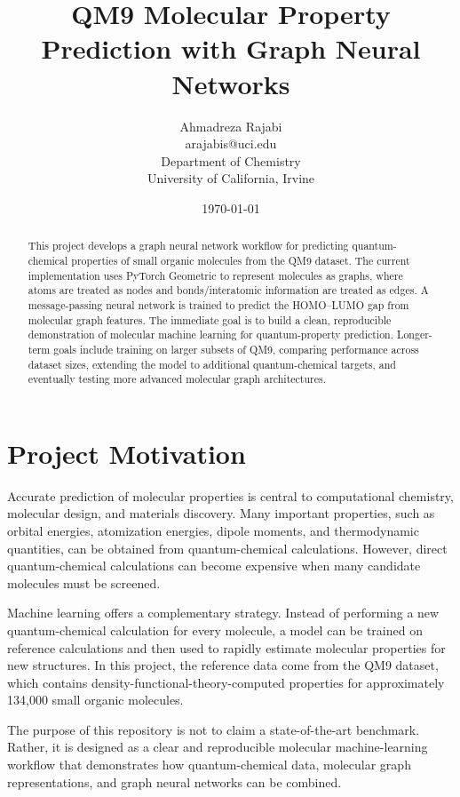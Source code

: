 \documentclass[11pt]{article}
\title{\textbf{QM9 Molecular Property Prediction with Graph Neural Networks}}
\author{
Ahmadreza Rajabi \\
arajabis@uci.edu \\
Department of Chemistry\\
University of California, Irvine
}
\date{\today}
\begin{document}
\maketitle

\begin{abstract}
This project develops a graph neural network workflow for predicting quantum-chemical properties of small organic molecules from the QM9 dataset. The current implementation uses PyTorch Geometric to represent molecules as graphs, where atoms are treated as nodes and bonds/interatomic information are treated as edges. A message-passing neural network is trained to predict the HOMO--LUMO gap from molecular graph features. The immediate goal is to build a clean, reproducible demonstration of molecular machine learning for quantum-property prediction. Longer-term goals include training on larger subsets of QM9, comparing performance across dataset sizes, extending the model to additional quantum-chemical targets, and eventually testing more advanced molecular graph architectures.
\end{abstract}

\section{Project Motivation}

Accurate prediction of molecular properties is central to computational chemistry, molecular design, and materials discovery. Many important properties, such as orbital energies, atomization energies, dipole moments, and thermodynamic quantities, can be obtained from quantum-chemical calculations. However, direct quantum-chemical calculations can become expensive when many candidate molecules must be screened.

Machine learning offers a complementary strategy. Instead of performing a new quantum-chemical calculation for every molecule, a model can be trained on reference calculations and then used to rapidly estimate molecular properties for new structures. In this project, the reference data come from the QM9 dataset, which contains density-functional-theory-computed properties for approximately 134,000 small organic molecules.

The purpose of this repository is not to claim a state-of-the-art benchmark. Rather, it is designed as a clear and reproducible molecular machine-learning workflow that demonstrates how quantum-chemical data, molecular graph representations, and graph neural networks can be combined.
\end{document}
